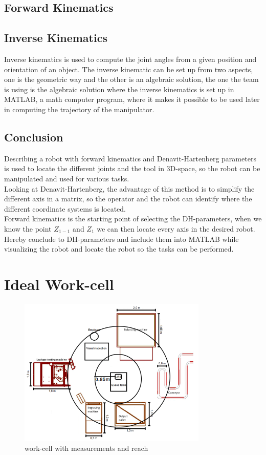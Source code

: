 \section{Forward Kinematics}

\newpage
\section{Inverse Kinematics}
Inverse kinematics is used to compute the joint angles from a given position and orientation of an object\cite{JohnC}. The inverse kinematic can be set up from two aspects, one is the geometric way and the other is an algebraic solution, the one the team is using is the algebraic solution where the inverse kinematics is set up in MATLAB, a math computer program, where it makes it possible to be used later in computing the trajectory of the manipulator.\\
\section{Conclusion}

Describing a robot with forward kinematics and Denavit-Hartenberg parameters is used to locate the different joints and the tool in 3D-space, so the robot can be manipulated and used for various tasks.\\
Looking at Denavit-Hartenberg, the advantage of this method is to simplify the different axis in a matrix, so the operator and the robot can identify where the different coordinate systems is located.\\
Forward kinematics is the starting point of selecting the DH-parameters, when we know the point $Z_{1-1}$ and $Z_1$ we can then locate every axis in the desired robot. Hereby conclude to DH-parameters and include them into MATLAB while visualizing the robot and locate the robot so the tasks can be performed.\\

\chapter{Ideal Work-cell}\label{IdealWorkCell}

\begin{figure}[h]
    \centering
    \includegraphics[width=9cm]{Design/Work_cell_3.png}
    \caption{work-cell with measurements and reach}
    \label{fig:workcellMR}
\end{figure}

